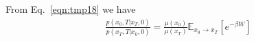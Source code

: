 \documentclass[aps, pre, preprint,unsortedaddress,a4paper,onecolumn]{revtex4-1}
\newcommand{\mc}[0]{\mathcal {C}}
\begin{document}
From Eq.~\eqref{eqn:tmp18} we have
\begin{align}
  \label{eq:tmp22}
  \frac{p(x_0,T\vert x_T,0)}{  p(x_T,T\vert x_0,0)  }
  =
  \frac{\mu(x_0)}{\mu(x_T)}
  \mathbb E_{x_0\rightarrow x_T} [e^{-\beta W}]
\end{align}


{}

\end{document}
